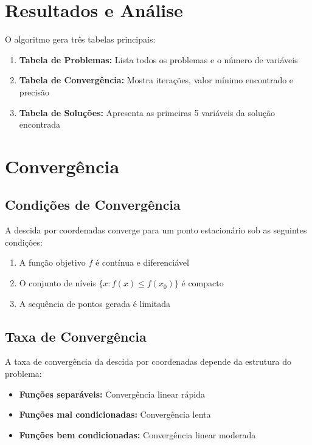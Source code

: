 \documentclass[12pt]{article}
\begin{document}
\section{Resultados e Análise}

O algoritmo gera três tabelas principais:

\begin{enumerate}
    \item \textbf{Tabela de Problemas:} Lista todos os problemas e o número de variáveis
    \item \textbf{Tabela de Convergência:} Mostra iterações, valor mínimo encontrado e precisão
    \item \textbf{Tabela de Soluções:} Apresenta as primeiras 5 variáveis da solução encontrada
\end{enumerate}

\section{Convergência}

\subsection{Condições de Convergência}

A descida por coordenadas converge para um ponto estacionário sob as seguintes condições:

\begin{enumerate}
    \item A função objetivo $f$ é contínua e diferenciável
    \item O conjunto de níveis $\{x : f(x) \leq f(x_0)\}$ é compacto
    \item A sequência de pontos gerada é limitada
\end{enumerate}

\subsection{Taxa de Convergência}

A taxa de convergência da descida por coordenadas depende da estrutura do problema:

\begin{itemize}
    \item \textbf{Funções separáveis:} Convergência linear rápida
    \item \textbf{Funções mal condicionadas:} Convergência lenta
    \item \textbf{Funções bem condicionadas:} Convergência linear moderada
\end{itemize}
\end{document}
